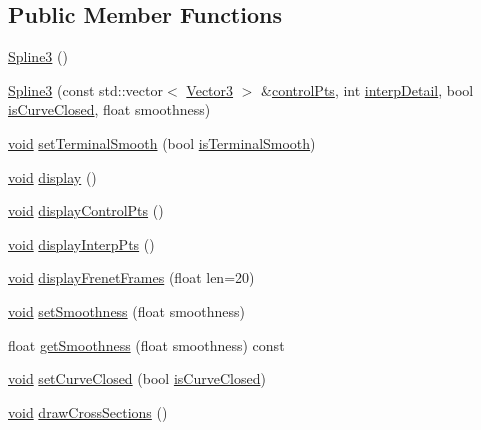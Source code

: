 \subsection*{Public Member Functions}
\begin{DoxyCompactItemize}
\item 
\hyperlink{class_spline3_ab42a566a389afc58c51c3bd647b4677a}{Spline3} ()
\item 
\hyperlink{class_spline3_adc99ac4835977956934ad5ffb59ee625}{Spline3} (const std\-::vector$<$ \hyperlink{class_vector3}{Vector3} $>$ \&\hyperlink{class_curve3_a2e9e6cfb4a03fffea0b4adbec17bba80}{control\-Pts}, int \hyperlink{class_curve3_a5ab0207ec14b339175e0aa9d621d70a7}{interp\-Detail}, bool \hyperlink{class_curve3_a94b01af1a451e35dbcec9ef36c4b4a64}{is\-Curve\-Closed}, float smoothness)
\item 
\hyperlink{glutf90_8h_ac778d6f63f1aaf8ebda0ce6ac821b56e}{void} \hyperlink{class_spline3_a9fc88b7f2b5ede8e7fa345f414cb34d8}{set\-Terminal\-Smooth} (bool \hyperlink{class_curve3_af842d273f3cdbb907f66ffed7b72d2a5}{is\-Terminal\-Smooth})
\item 
\hyperlink{glutf90_8h_ac778d6f63f1aaf8ebda0ce6ac821b56e}{void} \hyperlink{class_spline3_a503db55ba1523698067210952c2e470d}{display} ()
\item 
\hyperlink{glutf90_8h_ac778d6f63f1aaf8ebda0ce6ac821b56e}{void} \hyperlink{class_spline3_a303fadd7700a53382145ab961c123cc6}{display\-Control\-Pts} ()
\item 
\hyperlink{glutf90_8h_ac778d6f63f1aaf8ebda0ce6ac821b56e}{void} \hyperlink{class_spline3_a45cf582905d29565589cebfd12139f0a}{display\-Interp\-Pts} ()
\item 
\hyperlink{glutf90_8h_ac778d6f63f1aaf8ebda0ce6ac821b56e}{void} \hyperlink{class_spline3_ad480f955275c7004b451857db6605ac2}{display\-Frenet\-Frames} (float len=20)
\item 
\hyperlink{glutf90_8h_ac778d6f63f1aaf8ebda0ce6ac821b56e}{void} \hyperlink{class_spline3_a23748fc53b2c6892e8a55abe3c1a3381}{set\-Smoothness} (float smoothness)
\item 
float \hyperlink{class_spline3_a2f42946594cdef0359a3c3d2e05d6cff}{get\-Smoothness} (float smoothness) const 
\item 
\hyperlink{glutf90_8h_ac778d6f63f1aaf8ebda0ce6ac821b56e}{void} \hyperlink{class_spline3_ae664644a1b2435cf6053d09bd0d8ac3b}{set\-Curve\-Closed} (bool \hyperlink{class_curve3_a94b01af1a451e35dbcec9ef36c4b4a64}{is\-Curve\-Closed})
\item 
\hyperlink{glutf90_8h_ac778d6f63f1aaf8ebda0ce6ac821b56e}{void} \hyperlink{class_spline3_a534586484dcff0d7b28c3231ced4e9ab}{draw\-Cross\-Sections} ()
\end{DoxyCompactItemize}

